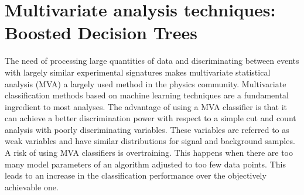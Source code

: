 \section{Multivariate analysis techniques: Boosted Decision Trees}
\label{sec:BDT}
The need of processing large quantities of data and discriminating between events with largely similar experimental signatures makes multivariate statistical analysis (MVA) a largely used method in the physics community. Multivariate classification methods based on machine learning techniques are a fundamental ingredient to most analyses. The advantage of using a MVA classifier is that it can achieve a better discrimination power with respect to a simple cut and count analysis with poorly discriminating variables. These variables are referred to as weak variables and have similar distributions for signal and background samples. 
A risk of using MVA classifiers is overtraining.  This happens when there are too many model parameters of an algorithm adjusted to too few data points. This leads to an increase in the classification performance over the objectively achievable one.

